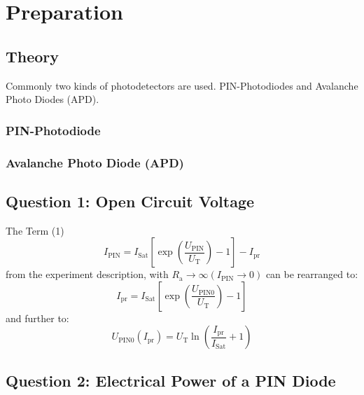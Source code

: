 \chapter{Preparation}

\section{Theory}
Commonly two kinds of photodetectors are used. PIN-Photodiodes and Avalanche Photo Diodes (APD).
\subsection{PIN-Photodiode}

\subsection{Avalanche Photo Diode (APD)}



\section{Question 1: Open Circuit Voltage}
The Term (1)
\begin{equation}
 I_{\mathrm{PIN}} = I_{\mathrm{Sat}}\left[\exp\left(\frac{U_{\mathrm{PIN}}}{U_{\mathrm{T}}}\right)-1\right] -I_{\mathrm{pr}}
\label{eq:diode}
\end{equation}
from the experiment description, with $R_{\mathrm{a}}\to\infty(I_{\mathrm{PIN}}\to0)$ can be rearranged to:
\begin{equation}
 I_{\mathrm{pr}} = I_{\mathrm{Sat}}\left[\exp\left(\frac{U_{\mathrm{PIN0}}}{U_{\mathrm{T}}}\right)-1\right]
\end{equation}
and further to:
\begin{equation}
 U_{\mathrm{PIN0}}(I_{\mathrm{pr}}) = U_{\mathrm{T}}\ln\left(\frac{I_{\mathrm{pr}}}{I_{\mathrm{Sat}}}+1\right)
\end{equation}

\section{Question 2: Electrical Power of a PIN Diode}


